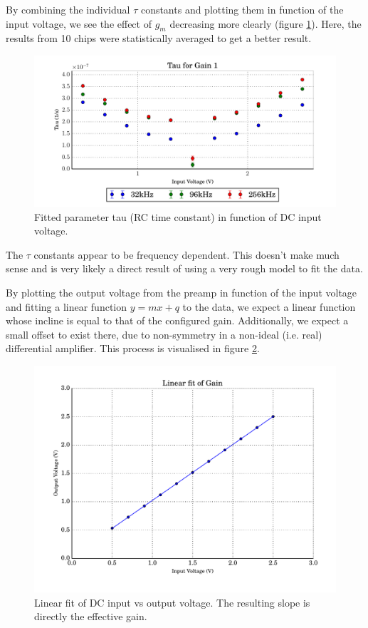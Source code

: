 By combining the individual $\tau$ constants and  plotting them in function of
the input voltage, we see the  effect of $g_m$ decreasing more clearly (figure
\ref{fig:tau}).  Here,  the  results from 10 chips were statistically averaged to get a better result.

\begin{figure}
    \centering
    \includegraphics[width=\linewidth]{images/plots/tau_results_1.pdf}
    \caption{Fitted parameter tau (RC time constant) in function of DC input voltage.}
    \label{fig:tau}
\end{figure}

The $\tau$ constants  appear to be frequency dependent. This doesn't make much
sense and is very likely a direct  result  of  using a very rough model to fit
the data.

By  plotting the  output voltage  from  the preamp  in function  of the  input
voltage and fitting a linear function $y=mx+q$ to the data, we expect a linear
function whose incline is equal  to that of the configured gain. Additionally,
we expect a  small offset to exist  there, due to non-symmetry  in a non-ideal
(i.e.  real) differential  amplifier.  This  process is  visualised in  figure
\ref{fig:linear_fit}.

\begin{figure}
    \centering
    \includegraphics[width=\linewidth]{images/plots/linear_fit.pdf}
    \caption{Linear fit of DC input vs output voltage. The resulting slope is directly the effective gain.}
    \label{fig:linear_fit}
\end{figure}

